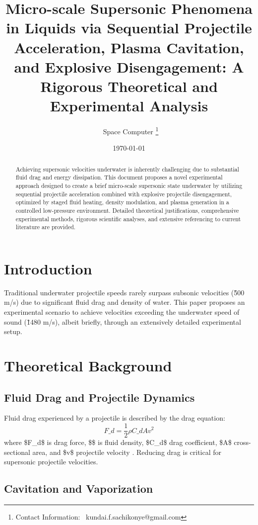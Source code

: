 \documentclass{article}
\title{Micro-scale Supersonic Phenomena in Liquids via Sequential Projectile Acceleration, Plasma Cavitation, and Explosive Disengagement: A Rigorous Theoretical and Experimental Analysis}
\author{\ Space Computer \thanks{Contact Information: \ kundai.f.sachikonye@gmail.com}}
\date{\today}
\begin{document}
\maketitle

\begin{abstract}
Achieving supersonic velocities underwater is inherently challenging due to substantial fluid drag and energy dissipation. This document proposes a novel experimental approach designed to create a brief micro-scale supersonic state underwater by utilizing sequential projectile acceleration combined with explosive projectile disengagement, optimized by staged fluid heating, density modulation, and plasma generation in a controlled low-pressure environment. Detailed theoretical justifications, comprehensive experimental methods, rigorous scientific analyses, and extensive referencing to current literature are provided.
\end{abstract}

\section{Introduction}

Traditional underwater projectile speeds rarely surpass subsonic velocities (\~500 m/s) due to significant fluid drag and density of water. This paper proposes an experimental scenario to achieve velocities exceeding the underwater speed of sound (\~1480 m/s), albeit briefly, through an extensively detailed experimental setup.

\section{Theoretical Background}

\subsection{Fluid Drag and Projectile Dynamics}

Fluid drag experienced by a projectile is described by the drag equation:
\begin{equation}
F\_d = \frac{1}{2}\rho C\_d A v^2
\end{equation}
where \$F\_d\$ is drag force, \$\rho\$ is fluid density, \$C\_d\$ drag coefficient, \$A\$ cross-sectional area, and \$v\$ projectile velocity \cite{white2006viscous}. Reducing drag is critical for supersonic projectile velocities.

\subsection{Cavitation and Vaporization}
\end{document}
